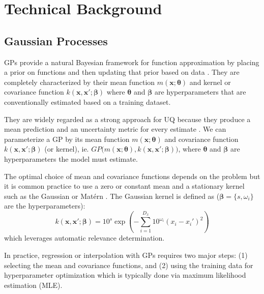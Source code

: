 \documentclass[11pt]{article}
\begin{document}
\section{Technical Background}
\label{sec:techbackground}

\subsection{Gaussian Processes}
\label{sec:gps}
GPs provide a natural Bayesian framework for function approximation by placing a prior on functions and then updating that prior based on data \cite{RN332}. They are completely characterized by their mean function $\textit{m}(\boldsymbol{x}; \boldsymbol{\theta})$ and kernel or covariance function $\textit{k}(\boldsymbol{x}, \boldsymbol{x'}; \boldsymbol{\beta})$ where $\boldsymbol{\theta}$ and $\boldsymbol{\beta}$ are hyperparameters that are conventionally estimated based on a training dataset. 

They are widely regarded as a strong approach for UQ because they produce a mean prediction and an uncertainty metric for every estimate \cite{UncertaintyReview}. We can parameterize a GP by its mean function $\textit{m}(\boldsymbol{x}; \boldsymbol{\theta})$ and covariance function $\textit{k}(\boldsymbol{x}, \boldsymbol{x'}; \boldsymbol{\beta})$ (or kernel), ie. $GP\big(\textit{m}(\boldsymbol{x}; \boldsymbol{\theta}), \textit{k}(\boldsymbol{x}, \boldsymbol{x'}; \boldsymbol{\beta})\big)$, where $\boldsymbol{\theta}$ and $\boldsymbol{\beta}$ are hyperparameters the model must estimate.

The optimal choice of mean and covariance functions depends on the problem but it is common practice to use a zero or constant mean and a stationary kernel such as the Gaussian or Mat\'ern \cite{RN2089}. The Gaussian kernel is defined as ($\boldsymbol{\beta} = \{s, \omega_i\}$ are the hyperparameters):
\begin{equation}
    k(\mathbf{x}, \mathbf{x}'; \boldsymbol{\beta}) = 10^s \exp\left(-\sum_{i=1}^{D_x} 10^{\omega_i}\left( x_i - x_i'\right)^2\right)
    \label{eq gaussian kernel}
\end{equation}
which leverages automatic relevance determination. 

In practice, regression or interpolation with GPs requires two major steps: (1) selecting the mean and covariance functions, and (2) using the training data for hyperparameter optimization which is typically done via maximum likelihood estimation (MLE).
\end{document}
